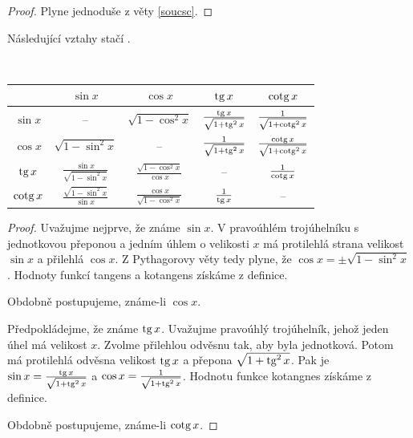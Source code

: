 \begin{proof}
    Plyne jednoduše z věty \ref{soucsc}.
\end{proof}

\begin{pozn}
    Následující vztahy stačí .
\end{pozn}

\begin{veta}\label{vyjadrenigonf}
  \,\\
  \begin{tabular}{| c || c | c | c | c |}
    \hline
    & $\sin x$ & $\cos x$ & $\operatorname{tg} x$ & $\operatorname{cotg} x$ \\
    \hline\hline
    $\sin x$ & -- & $\sqrt{1-\cos^2 x}$ & $\frac{\operatorname{tg} x}{\sqrt{1+\operatorname{tg}^2 x}}$ & $\frac{1}{\sqrt{1+\operatorname{cotg}^2 x}}$\\
    \hline
    $\cos x$ & $\sqrt{1-\sin^2 x}$ & -- & $\frac{1}{\sqrt{1+\operatorname{tg}^2 x}}$ & $\frac{\operatorname{cotg} x}{\sqrt{1+\operatorname{cotg}^2 x}}$\\
    \hline
    $\operatorname{tg} x$ & $\frac{\sin x}{\sqrt{1-\sin^2 x}}$ &  $\frac{\sqrt{1-\cos^2 x}}{\cos x}$ & -- & $\frac{1}{\operatorname{cotg} x}$\\
    \hline
    $\operatorname{cotg} x$ & $\frac{\sqrt{1-\sin^2 x}}{\sin x}$ & $\frac{\cos x}{\sqrt{1-\cos^2 x}}$ & $\frac{1}{\operatorname{tg} x}$ & --\\
    \hline
  \end{tabular}
\end{veta}

\begin{proof}
    Uvažujme nejprve, že známe $\sin x$. V pravoúhlém trojúhelníku s jednotkovou přeponou a jedním úhlem o velikosti
   $x$ má protilehlá strana velikost $\sin x$ a přilehlá $\cos x$. Z Pythagorovy věty tedy plyne, že
   $\cos x = \pm\sqrt{1-\sin^2 x}$. Hodnoty funkcí tangens a kotangens získáme z definice.
   \par Obdobně postupujeme, známe-li $\cos x$.
   \par Předpokládejme, že známe $\operatorname{tg} x$. Uvažujme pravoúhlý trojúhelník, jehož jeden úhel má velikost $x$.
   Zvolme přilehlou odvěsnu tak, aby byla jednotková. Potom má protilehlá odvěsna velikost $\operatorname{tg} x$ a přepona
   $\sqrt{1+\operatorname{tg}^2 x}$. Pak je $\sin x = \frac{\operatorname{tg} x}{\sqrt{1+\operatorname{tg}^2 x}}$ a $\cos x = \frac{1}{\sqrt{1+\operatorname{tg}^2 x}}$.
   Hodnotu funkce kotangnes získáme z definice.
   \par Obdobně postupujeme, známe-li $\operatorname{cotg} x$.
\end{proof}

